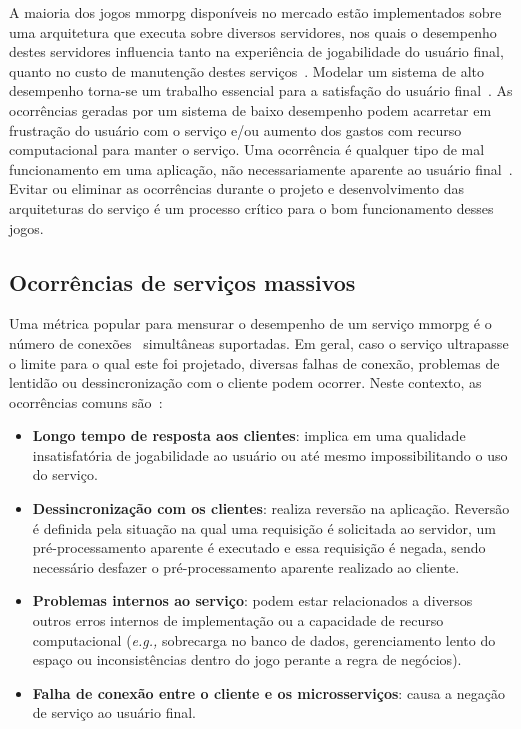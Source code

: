 A maioria dos jogos \ac{mmorpg} disponíveis no mercado estão implementados sobre uma arquitetura que executa sobre diversos servidores\cite{stephenclarkewillson2017}, nos quais o desempenho destes servidores influencia tanto na experiência de jogabilidade do usuário final, quanto no custo de manutenção destes serviços~\cite{1417630}.
%
Modelar um sistema de alto desempenho torna-se um trabalho essencial para a satisfação do usuário final~\cite{1417630}.
%
As ocorrências geradas por um sistema de baixo desempenho podem acarretar em frustração do usuário com o serviço e/ou aumento dos gastos com recurso computacional para manter o serviço.
%
Uma ocorrência é qualquer tipo de mal funcionamento em uma aplicação, não necessariamente aparente ao usuário final~\cite{1417630}.
%
Evitar ou eliminar as ocorrências durante o projeto e desenvolvimento das arquiteturas do serviço é um processo crítico para o bom funcionamento desses jogos.

\subsection{Ocorrências de serviços massivos}
\label{sec:ocorrencias}

Uma métrica popular para mensurar o desempenho de um serviço \ac{mmorpg} é o número de conexões~\cite{1417630} simultâneas suportadas.
%
Em geral, caso o serviço ultrapasse o limite para o qual este foi projetado, diversas falhas de conexão, problemas de lentidão ou dessincronização com o cliente podem ocorrer.
%
Neste contexto, as ocorrências comuns são~\cite{1417630}:

\begin{itemize}
  \item \textbf{Longo tempo de resposta aos clientes}: implica em uma qualidade insatisfatória de jogabilidade ao usuário ou até mesmo impossibilitando o uso do serviço.
  \item \textbf{Dessincronização com os clientes}: realiza reversão na aplicação. Reversão é definida pela situação na qual uma requisição é solicitada ao servidor, um pré-processamento aparente é executado e essa requisição é negada, sendo necessário desfazer o pré-processamento aparente realizado ao cliente.
  \item \textbf{Problemas internos ao serviço}:  podem estar relacionados a diversos outros erros internos de implementação ou a capacidade de recurso computacional (\textit{e.g.,} sobrecarga no banco de dados, gerenciamento lento do espaço ou inconsistências dentro do jogo perante a regra de negócios).
  \item \textbf{Falha de conexão entre o cliente e os microsserviços}: causa a negação de serviço ao usuário final.
\end{itemize}

